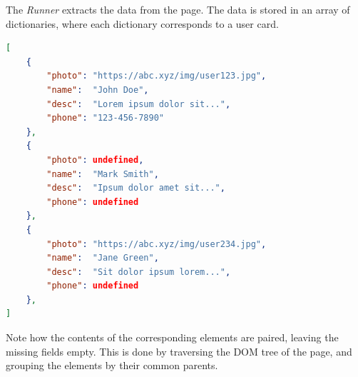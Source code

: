 The \textit{Runner} extracts the data from the page. The data is stored in an array of dictionaries, where each dictionary corresponds to a user card.

\begin{lstlisting}[language=json]
[
    {
        "photo": "https://abc.xyz/img/user123.jpg",
        "name":  "John Doe",
        "desc":  "Lorem ipsum dolor sit...",
        "phone": "123-456-7890"
    },
    {
        "photo": undefined,
        "name":  "Mark Smith",
        "desc":  "Ipsum dolor amet sit...",
        "phone": undefined
    },
    {
        "photo": "https://abc.xyz/img/user234.jpg",
        "name":  "Jane Green",
        "desc":  "Sit dolor ipsum lorem...",
        "phone": undefined
    },
]
\end{lstlisting}

Note how the contents of the corresponding elements are paired, leaving the missing fields empty.
This is done by traversing the \acs{DOM} tree of the page, and grouping the elements by their common parents.